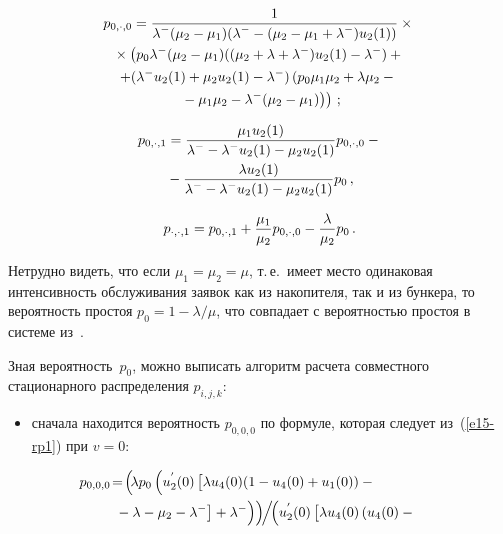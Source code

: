 \begin{multicols}{2}
\noindent
\begin{multline*}
p_{0, \cdot, 0}
=
\displaystyle\frac{\displaystyle 1\mathstrut}{\displaystyle \lambda^- (\mu_2 - \mu_1)
(\lambda^- - (\mu_2 - \mu_1 + \lambda^- ) u_2(1))
\mathstrut}
\times{}
\\
{}\times
\left (
p_0 \lambda^- (\mu_2 - \mu_1) ((\mu_2 + \lambda + \lambda^- ) u_2(1)- \lambda^- )
+{}\right.\\
+
(
\lambda^- u_2(1) + \mu_2 u_2(1) - \lambda^- )\left(
p_0 \mu_1 \mu_2 + \lambda \mu_2 - {}\right.\\
\left.\left.{}-\mu_1 \mu_2 -
 \lambda^- (\mu_2 - \mu_1)\right)
\right)
\,;
\end{multline*}

\vspace*{-6pt}

\noindent
\begin{multline*}
p_{0, \cdot,1} = \displaystyle\frac{\displaystyle  \mu_1 u_2(1)\mathstrut}{\displaystyle \lambda^- - \lambda^- u_2(1) -  \mu_2 u_2(1)\mathstrut} p_{0, \cdot,0} -{}\\
{}- \displaystyle\frac{\displaystyle \lambda u_2(1)\mathstrut}{\displaystyle \lambda^- - \lambda^- u_2(1) -  \mu_2 u_2(1) \mathstrut} p_0\,,
\end{multline*}

\noindent
\begin{equation*}
\label{e16-r}
p_{\cdot, \cdot,1} = p_{0, \cdot,1}
+\displaystyle\frac{\displaystyle \mu_1\mathstrut}{\displaystyle \mu_2\mathstrut} p_{0, \cdot,0} - \displaystyle\frac{\displaystyle \lambda\mathstrut}{\displaystyle \mu_2\mathstrut} p_0\,.
\end{equation*}

Нетрудно видеть, что если $\mu_1=\mu_2=\mu$, т.\,е.\
имеет место одинаковая интенсивность обслуживания заявок как из накопителя, так и из бункера,
то вероятность простоя $p_0=1- \lambda / \mu$, что совпадает с вероятностью простоя
 в системе из~\cite{mandzo}.

Зная вероятность~$p_0$, можно выписать алгоритм
расчета совместного стационарного распределения $p_{i,j,k}$:
\begin{itemize}
\item сначала находится вероятность $p_{0,0,0}$ по
формуле, которая следует из~(\ref{e15-rp1}) при $v = 0$:

\noindent
\begin{multline*}
\!\!\!\!\!p_{0,0,0} \!=\! \left(\!\lambda p_0 \left( u^{'}_2(0) \left[
\vphantom{\lambda_2^-}
 \lambda u_4(0) ( 1 - u_4(0) + u_1(0) )
 -{}\right.\right.\right.\hphantom{-4.68806pt}\\
\!\!\!\!\!\left.\left.\left.{}-\lambda - \mu_2 -  \lambda^- \right] + \lambda^-
\vphantom{u_2^{'}}\right)\right)\!\!\Big /\!\!\left( u^{'}_2(0)
\left[ \vphantom{\lambda^-}
\lambda u_4(0) \left(u_4(0) -{}\right.\right.\right.
\end{multline*}


\end{itemize}
\end{multicols}

